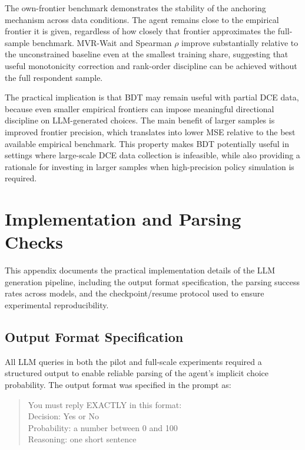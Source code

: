 \documentclass[11pt]{article}
\begin{document}
The own-frontier benchmark demonstrates the stability of the anchoring mechanism across data conditions. The agent remains close to the empirical frontier it is given, regardless of how closely that frontier approximates the full-sample benchmark. MVR-Wait and Spearman \(\rho\) improve substantially relative to the unconstrained baseline even at the smallest training share, suggesting that useful monotonicity correction and rank-order discipline can be achieved without the full respondent sample.

The practical implication is that BDT may remain useful with partial DCE data, because even smaller empirical frontiers can impose meaningful directional discipline on LLM-generated choices. The main benefit of larger samples is improved frontier precision, which translates into lower MSE relative to the best available empirical benchmark. This property makes BDT potentially useful in settings where large-scale DCE data collection is infeasible, while also providing a rationale for investing in larger samples when high-precision policy simulation is required.
\section{Implementation and Parsing Checks}
\label{app:implementation}

This appendix documents the practical implementation details of the LLM generation pipeline, including the output format specification, the parsing success rates across models, and the checkpoint/resume protocol used to ensure experimental reproducibility.

\subsection{Output Format Specification}
\label{app:output_format}

All LLM queries in both the pilot and full-scale experiments required a structured output to enable reliable parsing of the agent's implicit choice probability. The output format was specified in the prompt as:

\begin{quote}\small
You must reply EXACTLY in this format:\\
Decision: Yes or No\\
Probability: a number between 0 and 100\\
Reasoning: one short sentence
\end{quote}
\end{document}
